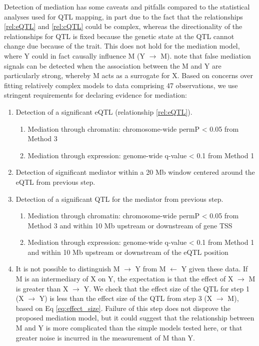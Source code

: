 \documentclass[9pt,twocolumn,twoside]{gsajnl}
\begin{document}
Detection of mediation has some caveats and pitfalls compared to the statistical analyses used for QTL mapping, in part due to the fact that the relationships \ref{rel:eQTL} and \ref{rel:cQTL} could be complex, whereas the directionality of the relationships for QTL is fixed because the genetic state at the QTL cannot change due because of the trait. This does not hold for the mediation model, where Y could in fact causally influence M (Y $\rightarrow$ M). \cite{Didelez2007} note that false mediation signals can be detected when the association between the M and Y are particularly strong, whereby M acts as a surrogate for X. Based on concerns over fitting relatively complex models to data comprising 47 observations, we use stringent requirements for declaring evidence for mediation:
\begin{enumerate}
	\item Detection of a significant eQTL (relationship \ref{rel:eQTL}).
    \begin{enumerate}
    	\item Mediation through chromatin: chromosome-wide permP < 0.05 from Method 3
        \item Mediation through expression: genome-wide q-value < 0.1 from Method 1
    \end{enumerate}
    \item Detection of significant mediator within a 20 Mb window centered around the eQTL from previous step.
    \item Detection of a significant QTL for the mediator from previous step.
    \begin{enumerate}
    	\item Mediation through chromatin: chromosome-wide permP < 0.05 from Method 3 and within 10 Mb upstream or downstream of gene TSS
        \item Mediation through expression: genome-wide q-value < 0.1 from Method 1 and within 10 Mb upstream or downstream of the eQTL position
    \end{enumerate}
    \item It is not possible to distinguish M $\rightarrow$ Y from M $\leftarrow$ Y given these data. If M is an intermediary of X on Y, the expectation is that the effect of X $\rightarrow$ M is greater than X $\rightarrow$ Y. We check that the effect size of the QTL for step 1 (X $\rightarrow$ Y) is less than the effect size of the QTL from step 3 (X $\rightarrow$ M), based on Eq \ref{eq:effect_size}. Failure of this step does not disprove the proposed mediation model, but it could suggest that the relationship between M and Y is more complicated than the simple models tested here, or that greater noise is incurred in the measurement of M than Y.
\end{enumerate}
\end{document}
